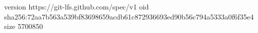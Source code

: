 version https://git-lfs.github.com/spec/v1
oid sha256:72aa7b563a539bf83698659acdb61c872936693ed90b56c794a5333a0f6f35e4
size 5700850
